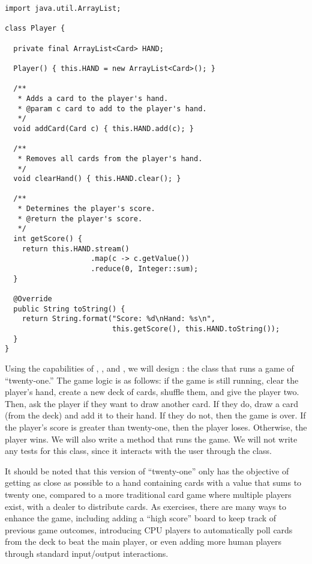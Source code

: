 \begin{lstlisting}[language=MyJava]
import java.util.ArrayList;

class Player {

  private final ArrayList<Card> HAND;

  Player() { this.HAND = new ArrayList<Card>(); }

  /**
   * Adds a card to the player's hand.
   * @param c card to add to the player's hand.
   */
  void addCard(Card c) { this.HAND.add(c); }

  /**
   * Removes all cards from the player's hand.
   */
  void clearHand() { this.HAND.clear(); }

  /**
   * Determines the player's score.
   * @return the player's score.
   */
  int getScore() {
    return this.HAND.stream()
                    .map(c -> c.getValue())
                    .reduce(0, Integer::sum);
  }

  @Override
  public String toString() {
    return String.format("Score: %d\nHand: %s\n", 
                         this.getScore(), this.HAND.toString());
  }
}
\end{lstlisting}

Using the capabilities of , , and , we will design : the class that runs a game of ``twenty-one.'' 
The game logic is as follows: if the game is still running, clear the player's hand, create a new deck of cards, shuffle them, and give the player two. 
Then, ask the player if they want to draw another card. 
If they do, draw a card (from the deck) and add it to their hand. 
If they do not, then the game is over. 
If the player's score is greater than twenty-one, then the player loses. Otherwise, the player wins. 
We will also write a  method that runs the game. 
We will not write any tests for this class, since it interacts with the user through the  class.

It should be noted that this version of ``twenty-one'' only has the objective of getting as close as possible to a hand containing cards with a value that sums to twenty one, compared to a more traditional card game where multiple players exist, with a dealer to distribute cards. 
As exercises, there are many ways to enhance the game, including adding a ``high score'' board to keep track of previous game outcomes, introducing CPU players to automatically poll cards from the deck to beat the main player, or even adding more human players through standard input/output interactions. 

